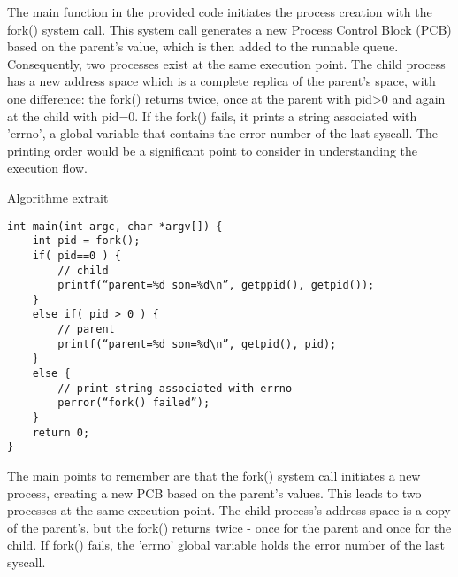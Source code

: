The main function in the provided code initiates the process creation with the fork() system call. This system call generates a new Process Control Block (PCB) based on the parent's value, which is then added to the runnable queue. Consequently, two processes exist at the same execution point. The child process has a new address space which is a complete replica of the parent's space, with one difference: the fork() returns twice, once at the parent with pid>0 and again at the child with pid=0. If the fork() fails, it prints a string associated with 'errno', a global variable that contains the error number of the last syscall. The printing order would be a significant point to consider in understanding the execution flow.
\begin{algorithm}[H]
\caption{Algorithme extrait}
\begin{algorithmic}
\begin{verbatim} 
int main(int argc, char *argv[]) { 
	int pid = fork(); 
	if( pid==0 ) { 
		// child 
		printf(“parent=%d son=%d\n”, getppid(), getpid()); 
	} 
	else if( pid > 0 ) { 
		// parent 
		printf(“parent=%d son=%d\n”, getpid(), pid); 
	} 
	else { 
		// print string associated with errno 
		perror(“fork() failed”); 
	} 
	return 0; 
}
\end{verbatim}
\end{algorithmic}
\end{algorithm}
\begin{tcolorbox}[colback=yellow!5, colframe=yellow!80!black, title={\faBookmark\hspace{0.5em}\textbf{\`A retenir}}]
The main points to remember are that the fork() system call initiates a new process, creating a new PCB based on the parent's values. This leads to two processes at the same execution point. The child process's address space is a copy of the parent's, but the fork() returns twice - once for the parent and once for the child. If fork() fails, the 'errno' global variable holds the error number of the last syscall.
\end{tcolorbox}

